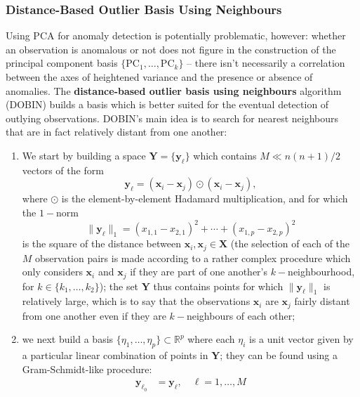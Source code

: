 \subsubsection*{Distance-Based Outlier Basis Using Neighbours}
Using PCA for anomaly detection is potentially problematic, however: whether an observation is anomalous or not does not figure in the construction of the principal component basis $\{\text{PC}_1,\ldots,\text{PC}_k\}$ -- there isn't necessarily a correlation between the axes of heightened variance and the presence or absence of anomalies. 
\newl 
The \textbf{distance-based outlier basis using neighbours} algorithm (DOBIN) builds a basis which is better suited for the eventual detection of outlying observations. DOBIN's main idea is to search for nearest neighbours that are in fact relatively distant from one another: 
\begin{enumerate}[noitemsep] 
\item We start by building a space $\mathbf{Y}=\{\mathbf{y}_{\ell}\}$  which contains $M\ll n(n+1)/2$  vectors of the form $$\mathbf{y}_{\ell}=(\mathbf{x}_i -\mathbf{x}_j)\odot (\mathbf{x}_i -\mathbf{x}_j), $$ where $\odot$ is the element-by-element Hadamard multiplication, and for which the $1-$norm  $$\|\mathbf{y}_{\ell}\|_1=(x_{1,1}-x_{2,1})^2+\cdots +(x_{1,p}-x_{2,p})^2 $$ is the square of the distance between $\mathbf{x}_i,\mathbf{x}_j \in\mathbf{X}$ (the selection of each of the $M$ observation pairs is made according to a rather complex procedure which only considers $\mathbf{x}_i$ and $\mathbf{x}_j$ if they are part of one another's $k-$neighbourhood, for $k\in\{k_1,\ldots, k_2\}$); the set $\mathbf{Y}$ thus contains points for which $\|\mathbf{y}_{\ell}\|_1$ is relatively large, which is to say that the observations $\mathbf{x}_i$ are $\mathbf{x}_j$ fairly distant from one another even if they are $k-$neighbours of each other;
\item we next build a basis $\{\eta_1,\ldots,\eta_p\}\subset \mathbb{R}^p$ where each  $\eta_i$ is a unit vector given by a particular linear combination of points in $\mathbf{Y}$; they can be found using a  Gram-Schmidt-like procedure: 
\begin{align*}
\mathbf{y}_{\ell_0}&=\mathbf{y}_{\ell},\quad \ell=1,\ldots, M \\ 

\end{align*}
\end{enumerate}
